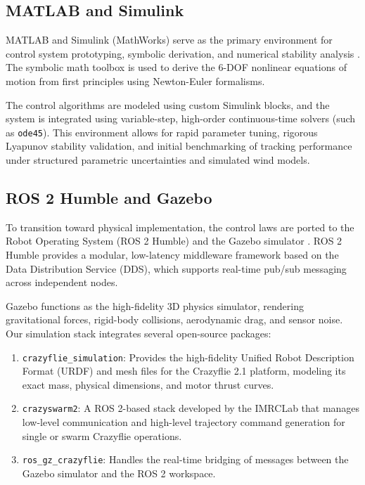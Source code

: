 \subsection{MATLAB and Simulink}
MATLAB and Simulink (MathWorks) serve as the primary environment for control system prototyping, symbolic derivation, and numerical stability analysis \cite{ref_23}. The symbolic math toolbox is used to derive the 6-DOF nonlinear equations of motion from first principles using Newton-Euler formalisms. 

The control algorithms are modeled using custom Simulink blocks, and the system is integrated using variable-step, high-order continuous-time solvers (such as \texttt{ode45}). This environment allows for rapid parameter tuning, rigorous Lyapunov stability validation, and initial benchmarking of tracking performance under structured parametric uncertainties and simulated wind models.

\subsection{ROS 2 Humble and Gazebo}
To transition toward physical implementation, the control laws are ported to the Robot Operating System (ROS 2 Humble) and the Gazebo simulator \cite{ref_15, ref_16}. ROS 2 Humble provides a modular, low-latency middleware framework based on the Data Distribution Service (DDS), which supports real-time pub/sub messaging across independent nodes. 

Gazebo functions as the high-fidelity 3D physics simulator, rendering gravitational forces, rigid-body collisions, aerodynamic drag, and sensor noise. Our simulation stack integrates several open-source packages:
\begin{enumerate}
    \item \texttt{crazyflie\_simulation}: Provides the high-fidelity Unified Robot Description Format (URDF) and mesh files for the Crazyflie 2.1 platform, modeling its exact mass, physical dimensions, and motor thrust curves.
    \item \texttt{crazyswarm2}: A ROS 2-based stack developed by the IMRCLab that manages low-level communication and high-level trajectory command generation for single or swarm Crazyflie operations.
    \item \texttt{ros\_gz\_crazyflie}: Handles the real-time bridging of messages between the Gazebo simulator and the ROS 2 workspace.
\end{enumerate}

